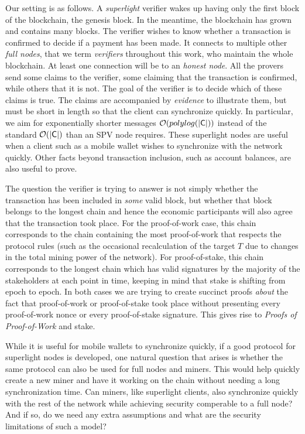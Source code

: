 Our setting is as follows. A \emph{superlight} verifier wakes up having only the
first block of the blockchain, the genesis block. In the meantime, the
blockchain has grown and contains many blocks. The verifier wishes to know
whether a transaction is confirmed to decide if a payment has been made. It
connects to multiple other \emph{full nodes}, that we term \emph{verifiers}
throughout this work, who maintain the whole blockchain. At least one connection
will be to an \emph{honest node}. All the provers send some claims to the
verifier, some claiming that the transaction is confirmed, while others that it
is not. The goal of the verifier is to decide which of these claims is true. The
claims are accompanied by \emph{evidence} to illustrate them, but must be short
in length so that the client can synchronize quickly. In particular, we aim for
exponentially shorter messages $\mathcal{O}(polylog(|\mathsf{C}|))$ instead of the
standard $\mathcal{O}(|\mathsf{C}|)$ than an SPV node requires. These superlight nodes are
useful when a client such as a mobile wallet wishes to synchronize with the
network quickly. Other facts beyond transaction inclusion, such as account
balances, are also useful to prove.

The question the verifier is trying to answer is not simply whether the
transaction has been included in \emph{some} valid block, but whether that block
belongs to the longest chain and hence the economic participants will also agree
that the transaction took place. For the proof-of-work case, this chain
corresponds to the chain containing the most proof-of-work that respects the
protocol rules (such as the occasional recalculation of the target $T$ due to
changes in the total mining power of the network). For proof-of-stake, this
chain corresponds to the longest chain which has valid signatures by the
majority of the stakeholders at each point in time, keeping in mind that stake
is shifting from epoch to epoch. In both cases we are trying to create succinct
proofs \emph{about} the fact that proof-of-work or proof-of-stake took place
without presenting every proof-of-work nonce or every proof-of-stake signature.
This gives rise to \emph{Proofs of Proof-of-Work} and stake.

While it is useful for mobile wallets to synchronize quickly, if a good protocol
for superlight nodes is developed, one natural question that arises is whether
the same protocol can also be used for full nodes and miners. This would help
quickly create a new miner and have it working on the chain without needing a
long synchronization time. Can miners, like superlight clients, also synchronize
quickly with the rest of the network while achieving security comperable to a
full node? And if so, do we need any extra assumptions and what are the security
limitations of such a model?

